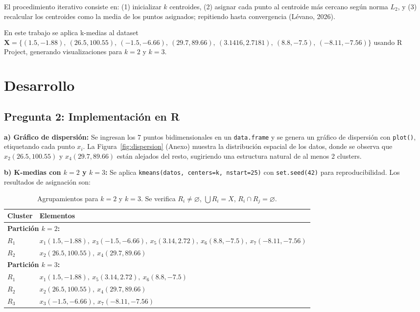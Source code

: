 \documentclass[10pt,a4paper]{article}
\begin{document}
El procedimiento iterativo consiste en: (1) inicializar $k$ centroides, (2) asignar cada punto al centroide m\'as cercano seg\'un norma $L_2$, y (3) recalcular los centroides como la media de los puntos asignados; repitiendo hasta convergencia (L\'evano, 2026).

En este trabajo se aplica k-medias al dataset $\mathbf{X} = \{(1.5, -1.88),\ (26.5, 100.55),\ (-1.5, -6.66),\ (29.7, 89.66),\ (3.1416, 2.7181),\ (8.8, -7.5),\ (-8.11, -7.56)\}$ usando R Project, generando visualizaciones para $k=2$ y $k=3$.

\section{Desarrollo}

\subsection{Pregunta 2: Implementaci\'on en R}

\textbf{a) Gr\'afico de dispersi\'on:} Se ingresan los 7 puntos bidimensionales en un \texttt{data.frame} y se genera un gr\'afico de dispersi\'on con \texttt{plot()}, etiquetando cada punto $x_i$. La Figura~\ref{fig:dispersion} (Anexo) muestra la distribuci\'on espacial de los datos, donde se observa que $x_2(26.5, 100.55)$ y $x_4(29.7, 89.66)$ est\'an alejados del resto, sugiriendo una estructura natural de al menos 2 clusters.

\textbf{b) K-medias con $k=2$ y $k=3$:} Se aplica \texttt{kmeans(datos, centers=k, nstart=25)} con \texttt{set.seed(42)} para reproducibilidad. Los resultados de asignaci\'on son:

\begin{table}[H]
\centering
\footnotesize
\begin{tabular}{p{1.8cm} p{12cm}}
\toprule
\textbf{Cluster} & \textbf{Elementos} \\
\midrule
\multicolumn{2}{l}{\textbf{Partici\'on $k=2$:}} \\
$R_1$ & $x_1(1.5, -1.88),\ x_3(-1.5, -6.66),\ x_5(3.14, 2.72),\ x_6(8.8, -7.5),\ x_7(-8.11, -7.56)$ \\
$R_2$ & $x_2(26.5, 100.55),\ x_4(29.7, 89.66)$ \\
\midrule
\multicolumn{2}{l}{\textbf{Partici\'on $k=3$:}} \\
$R_1$ & $x_1(1.5, -1.88),\ x_5(3.14, 2.72),\ x_6(8.8, -7.5)$ \\
$R_2$ & $x_2(26.5, 100.55),\ x_4(29.7, 89.66)$ \\
$R_3$ & $x_3(-1.5, -6.66),\ x_7(-8.11, -7.56)$ \\
\bottomrule
\end{tabular}
\caption{Agrupamientos para $k=2$ y $k=3$. Se verifica $R_i \neq \varnothing$, $\bigcup R_i = X$, $R_i \cap R_j = \varnothing$.}
\label{tab:particiones}
\end{table}
\end{document}
